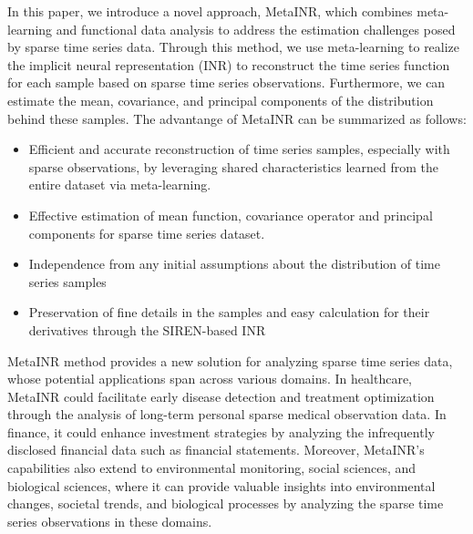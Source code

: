 \documentclass{article}
\begin{document}
In this paper, we introduce a novel approach, MetaINR, which combines meta-learning and functional data analysis to address the estimation challenges posed by sparse time series data. 
Through this method, we use meta-learning to realize the implicit neural representation (INR) to
reconstruct the time series function for each sample based on sparse time series observations.
Furthermore, we can estimate the mean, covariance, and principal components of the distribution behind these samples.
The advantange of MetaINR can be summarized as follows:
  \begin{itemize}
    \item Efficient and accurate reconstruction of time series samples, especially with sparse observations, by leveraging shared characteristics learned from the entire dataset via meta-learning.
    \item Effective estimation of mean function, covariance operator and principal components for sparse time series dataset.
    \item Independence from any initial assumptions about the distribution of time series samples
    \item Preservation of fine details in the samples and easy calculation for their derivatives through the SIREN-based INR
  \end{itemize}

MetaINR method provides a new solution for analyzing sparse time series data,
whose potential applications span across various domains.
In healthcare, MetaINR could facilitate early disease detection and treatment optimization through the analysis of long-term personal sparse medical observation data.
In finance, it could enhance investment strategies by analyzing the infrequently disclosed financial data such as financial statements. 
Moreover, MetaINR's capabilities also extend to environmental monitoring, social sciences, and biological sciences, where it can provide valuable insights into environmental changes, societal trends, and biological processes by analyzing the sparse time series observations in these domains. 


\end{document}
